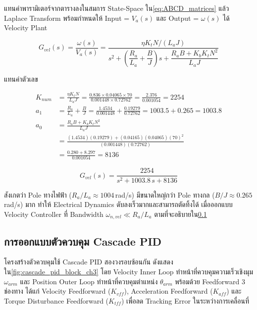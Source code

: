 แทนค่าพารามิเตอร์จากตารางลงในสมการ State-Space
ใน\cref{eq:ABCD_matrices} แล้ว Laplace Transform
พร้อมกำหนดให้ Input = $V_a(s)$ และ Output = $\omega(s)$
ได้ Velocity Plant

\begin{equation}
    G_{vel}(s) = \frac{\omega(s)}{V_a(s)}
               = \frac{\eta K_t N / (L_a J)}
                      {s^2 + \!\left(\dfrac{R_a}{L_a}
                      + \dfrac{B}{J}\right)\!s
                      + \dfrac{R_a B + K_b K_t N^2}{L_a J}}
    \label{eq:Gvel_sym}
\end{equation}

แทนค่าตัวเลข

\begin{align}
    K_{num} &= \frac{\eta K_t N}{L_a J}
             = \frac{0.836 \times 0.04065 \times 70}{0.001448 \times 0.72762}
             = \frac{2.376}{0.001054} = 2254 \label{eq:Gvel_Knum} \\[4pt]
    a_1     &= \frac{R_a}{L_a} + \frac{B}{J}
             = \frac{1.4534}{0.001448} + \frac{0.19279}{0.72762}
             = 1003.5 + 0.265 = 1003.8 \label{eq:Gvel_a1} \\[4pt]
    a_0     &= \frac{R_a B + K_b K_t N^2}{L_a J} \nonumber \\
             &= \frac{(1.4534)(0.19279) + (0.04165)(0.04065)(70)^2}
                    {(0.001448)(0.72762)} \nonumber \\
             &= \frac{0.280 + 8.297}{0.001054} = 8136 \label{eq:Gvel_a0}
\end{align}

\begin{equation}
    G_{vel}(s) = \frac{2254}{s^2 + 1003.8\,s + 8136}
    \label{eq:Gvel_num}
\end{equation}

สังเกตว่า Pole ทางไฟฟ้า ($R_a/L_a \approx 1004$\,rad/s)
มีขนาดใหญ่กว่า Pole ทางกล ($B/J \approx 0.265$\,rad/s) มาก
ทำให้ Electrical Dynamics ดับลงเร็วมากและสามารถตัดทิ้งได้
เมื่อออกแบบ Velocity Controller ที่ Bandwidth
$\omega_{n,vel} \ll R_a/L_a$ ตามที่จะอธิบายใน\cref{subsec:pid_design}
\subsection{การออกแบบตัวควบคุม Cascade PID}
\label{subsec:pid_design}

โครงสร้างตัวควบคุมใช้ Cascade PID สองวงรอบซ้อนกัน
ดังแสดงใน\cref{fig:cascade_pid_block_ch3}
โดย Velocity Inner Loop ทำหน้าที่ควบคุมความเร็วเชิงมุม $\omega_{arm}$
และ Position Outer Loop ทำหน้าที่ควบคุมตำแหน่ง $\theta_{arm}$
พร้อมด้วย Feedforward 3 ช่องทาง ได้แก่
Velocity Feedforward ($K_{vff}$), Acceleration Feedforward ($K_{aff}$)
และ Torque Disturbance Feedforward ($K_{tff}$)
เพื่อลด Tracking Error ในระหว่างการเคลื่อนที่

